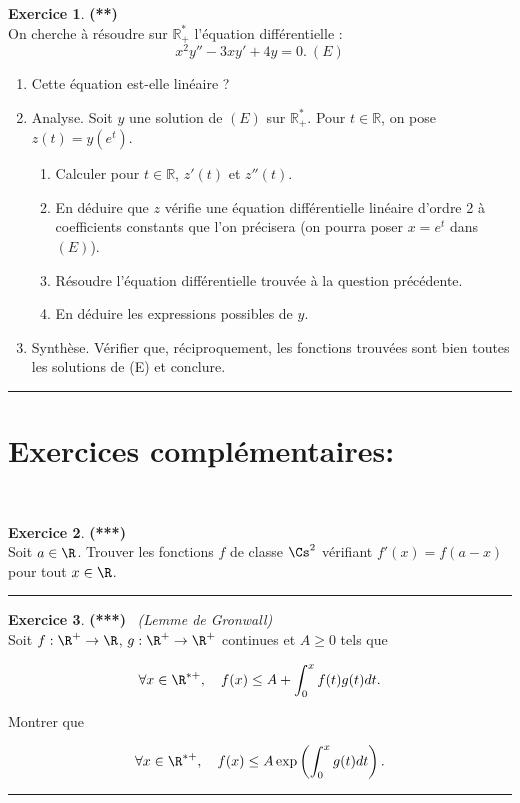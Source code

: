 \documentclass[a4paper,11pt]{article}
\theoremstyle{definition}
\newtheorem{exo}{Exercice} %
\begin{document}
\begin{minipage}{1\linewidth}
\begin{minipage}[t]{0.48\linewidth}
		\begin{exo}\textbf{(**)}\quad\\[0.2cm]
	On cherche à résoudre sur $\mathbb R_+^*$ l’équation diﬀérentielle :
	$$x^2y''-3xy'+4y = 0. \ (E)$$
	\begin{enumerate}
		\item Cette équation est-elle linéaire ? 
		\item Analyse. Soit $y$ une solution de $(E)$ sur $\mathbb R_+^*$. Pour $t\in\mathbb R$, on pose $z(t)=y(e^t)$.
		\begin{enumerate}
			\item Calculer pour $t\in\mathbb R$, $z'(t)$ et $z''(t)$.
			\item En déduire que $z$ vériﬁe une équation diﬀérentielle linéaire d’ordre 2 à coeﬃcients  constants que l’on précisera (on pourra poser $x = e^t$ dans $(E)$). 
			\item Résoudre l’équation différentielle trouvée à la question précédente.
			\item En déduire les expressions possibles de $y$.
		\end{enumerate}
		\item Synthèse. Vérifier que, réciproquement, les fonctions trouvées sont bien toutes les solutions de (E) et conclure.
	\end{enumerate}
			\centering
			\rule{1\linewidth}{0.6pt}
		\end{exo}
		

		
		
	\end{minipage}
\end{minipage}

\section*{Exercices complémentaires:}\hfill\\[-1cm]

		\raggedright
		
		
		\begin{exo}\textbf{(***)}\quad\\[0.2cm]
		Soit $a \in \R$. Trouver les fonctions $f$ de classe $\Cs^2$ vérifiant $f'(x) = f (a - x )$ pour tout $x \in \R$.
		
			\centering
			\rule{1\linewidth}{0.6pt}
		\end{exo}
		
		
		\begin{exo}\textbf{(***)} \ \textit{(Lemme de Gronwall)}\quad\\[0.2cm]
 			Soit $f : \R^+ \rightarrow \R$, $g : \R^+ \rightarrow \R^+$ continues et $A \geq 0$ tels que
 			
 			$$\forall x \in \R^{*+},\quad
 			f (x) \leq A + \int_{0}^{x}f (t )g (t ) dt .$$
 			
 			Montrer que
 			
 			$$\forall x \in \R^{*+},\quad
 			f (x) \leq A\exp\left(\int_{0}^{x}g (t ) dt\right) .$$
 			
			\centering
			\rule{1\linewidth}{0.6pt}
		\end{exo}
		
\end{document}
